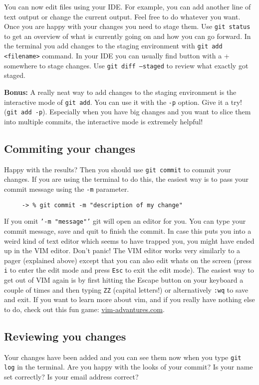 \documentclass[12pt]{article}
\begin{document}
You can now edit files using your IDE.
For example, you can add another line of text output or change the current output.
Feel free to do whatever you want.
Once you are happy with your changes
you need to stage them.
Use \texttt{git status} to get an overview of what is currently going on
and how you can go forward.
In the terminal you add changes to the staging environment with \texttt{git add <filename>} command.
In your IDE you can usually find button with a + somewhere to stage changes.
Use \texttt{git diff --staged} to review what exactly got staged.

\textbf{Bonus:} A really neat way to add changes to the staging environment
is the interactive mode of \texttt{git add}.
You can use it with the \texttt{-p} option. Give it a try! (\texttt{git add -p}).
Especially when you have big changes and you want to slice
them into multiple commits, the interactive mode is extremely helpful!

\subsection{Commiting your changes}
Happy with the results? Then you should use \texttt{git commit} to commit your changes.
If you are using the terminal to do this,
the easiest way is to pass your commit message using the \texttt{-m} parameter.

    \begin{verbatim}
     -> % git commit -m "description of my change"
    \end{verbatim}

If you omit \texttt{'-m "message"'} git will open an editor for you. You can type your commit message, save and quit to finish the commit. In case this puts you into a weird kind of text editor
which seems to have trapped you, you might have ended up in the VIM editor.
Don't panic!
The VIM editor works very similarly to a pager (explained above) except that you can also edit
whats on the screen (press \texttt{i} to enter the edit mode and press \texttt{Esc} to exit the edit mode).
The easiest way to get out of VIM again is by first hitting the Escape button on your keyboard a couple of times
and then typing \texttt{ZZ} (capital letters!) or alternatively \texttt{:wq} to save and exit.
If you want to learn more about vim,
and if you really have nothing else to do,
check out this fun game: \href{https://vim-adventures.com/}{vim-advantures.com}.

\subsection{Reviewing you changes}
Your changes have been added and you can see them now
when you type \texttt{git log} in the terminal.
Are you happy with the looks of your commit?
Is your name set correctly? Is your email address correct?
\end{document}
